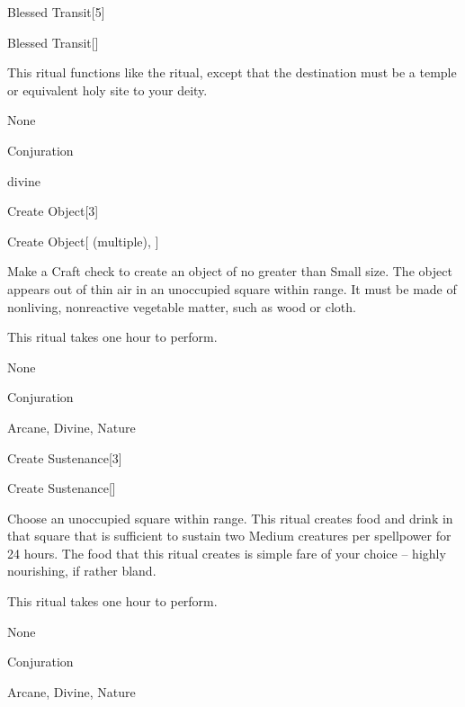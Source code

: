 \begin{spellsection}{Blessed Transit}[5]


\begin{ability}{Blessed Transit}[]

This ritual functions like the  ritual, except that the destination must be a temple or equivalent holy site to your deity.

\end{ability}


 None

 Conjuration

 divine
\end{spellsection}


\begin{spellsection}{Create Object}[3]


\begin{ability}{Create Object}[ (multiple), ]

Make a Craft check to create an object of no greater than Small size.
The object appears out of thin air in an unoccupied square within \rngclose range.
It must be made of nonliving, nonreactive vegetable matter, such as wood or cloth.

This ritual takes one hour to perform.

\end{ability}


 None

 Conjuration

 Arcane, Divine, Nature
\end{spellsection}


\begin{spellsection}{Create Sustenance}[3]


\begin{ability}{Create Sustenance}[]

Choose an unoccupied square within \rngclose range.
This ritual creates food and drink in that square that is sufficient to sustain two Medium creatures per spellpower for 24 hours.
The food that this ritual creates is simple fare of your choice -- highly nourishing, if rather bland.

This ritual takes one hour to perform.

\end{ability}


 None

 Conjuration

 Arcane, Divine, Nature
\end{spellsection}


